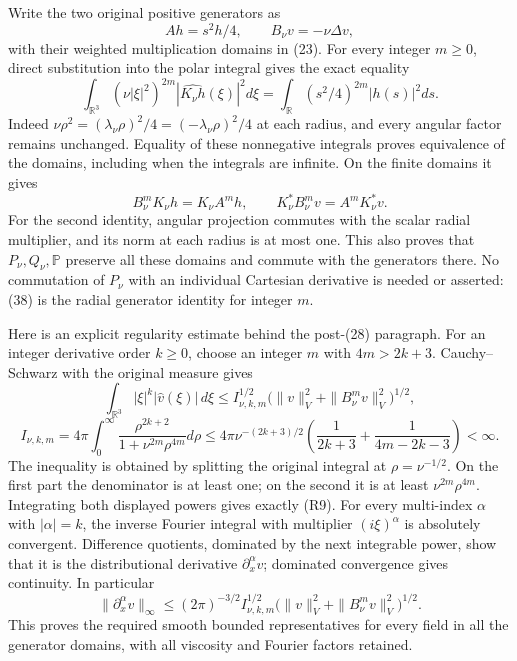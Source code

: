 Write the two original positive generators as \[
Ah=s^2h/4,
\qquad B_\nu v=-\nu\Delta v,
\] with their weighted multiplication domains in (23). For every integer \(m\ge0\), direct substitution into the polar integral gives the exact equality \[
\int_{\mathbb R^3}(\nu|\xi|^2)^{2m}
|\widehat{K_\nu h}(\xi)|^2d\xi
=\int_{\mathbb R}(s^2/4)^{2m}|h(s)|^2ds.
\tag{R6}
\] Indeed \(\nu\rho^2=(\lambda_\nu\rho)^2/4=(-\lambda_\nu\rho)^2/4\) at each radius, and every angular factor remains unchanged. Equality of these nonnegative integrals proves equivalence of the domains, including when the integrals are infinite. On the finite domains it gives \[
B_\nu^mK_\nu h=K_\nu A^mh,
\qquad K_\nu^*B_\nu^mv=A^mK_\nu^*v.
\tag{R7}
\] For the second identity, angular projection commutes with the scalar radial multiplier, and its norm at each radius is at most one. This also proves that \(P_\nu,Q_\nu,\mathbb P\) preserve all these domains and commute with the generators there. No commutation of \(P_\nu\) with an individual Cartesian derivative is needed or asserted: (38) is the radial generator identity for integer \(m\).

Here is an explicit regularity estimate behind the post-(28) paragraph. For an integer derivative order \(k\ge0\), choose an integer \(m\) with \(4m>2k+3\). Cauchy--Schwarz with the original measure gives \[
\int_{\mathbb R^3}|\xi|^k|\widehat v(\xi)|\,d\xi
\le I_{\nu,k,m}^{1/2}
\bigl(\|v\|_V^2+\|B_\nu^mv\|_V^2\bigr)^{1/2},
\tag{R8}
\] \[
I_{\nu,k,m}=4\pi\int_0^\infty
\frac{\rho^{2k+2}}{1+\nu^{2m}\rho^{4m}}d\rho
\le4\pi\nu^{-(2k+3)/2}
\left(\frac1{2k+3}+\frac1{4m-2k-3}\right)<\infty.
\tag{R9}
\] The inequality is obtained by splitting the original integral at \(\rho=\nu^{-1/2}\). On the first part the denominator is at least one; on the second it is at least \(\nu^{2m}\rho^{4m}\). Integrating both displayed powers gives exactly (R9). For every multi-index \(\alpha\) with \(|\alpha|=k\), the inverse Fourier integral with multiplier \((i\xi)^\alpha\) is absolutely convergent. Difference quotients, dominated by the next integrable power, show that it is the distributional derivative \(\partial_x^\alpha v\); dominated convergence gives continuity. In particular \[
\|\partial_x^\alpha v\|_\infty
\le(2\pi)^{-3/2}I_{\nu,k,m}^{1/2}
\bigl(\|v\|_V^2+\|B_\nu^mv\|_V^2\bigr)^{1/2}.
\tag{R10}
\] This proves the required smooth bounded representatives for every field in all the generator domains, with all viscosity and Fourier factors retained.

